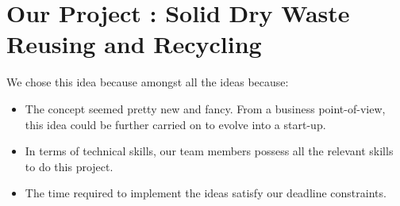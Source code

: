 \documentclass{article}
\begin{document}
\section{Our Project : Solid Dry Waste Reusing and Recycling}
\par We chose this idea because amongst all the ideas because:
\begin{itemize}
    \item The concept seemed pretty new and fancy. From a business point-of-view, this idea could be further carried on to evolve into a start-up. 
    \item In terms of technical skills, our team members possess all the relevant skills to do this project.
    \item The time required to implement the ideas satisfy our deadline constraints.
\end{itemize} 
\end{document}
